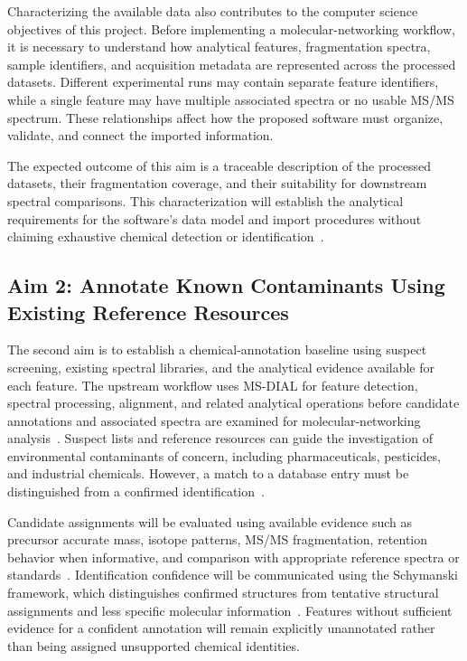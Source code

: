         Characterizing the available data also contributes to the computer science objectives of this project. Before implementing a molecular-networking workflow, it is necessary to understand how analytical features, fragmentation spectra, sample identifiers, and acquisition metadata are represented across the processed datasets. Different experimental runs may contain separate feature identifiers, while a single feature may have multiple associated spectra or no usable MS/MS spectrum. These relationships affect how the proposed software must organize, validate, and connect the imported information.

        The expected outcome of this aim is a traceable description of the processed datasets, their fragmentation coverage, and their suitability for downstream spectral comparisons. This characterization will establish the analytical requirements for the software's data model and import procedures without claiming exhaustive chemical detection or identification~\cite{Fisher2022,Schulze2020}.

    \subsection{Aim 2: Annotate Known Contaminants Using Existing Reference Resources}\label{subsec:aim-two}

        The second aim is to establish a chemical-annotation baseline using suspect screening, existing spectral libraries, and the analytical evidence available for each feature. The upstream workflow uses MS-DIAL for feature detection, spectral processing, alignment, and related analytical operations before candidate annotations and associated spectra are examined for molecular-networking analysis~\cite{Tsugawa2015,Tsugawa2020}. Suspect lists and reference resources can guide the investigation of environmental contaminants of concern, including pharmaceuticals, pesticides, and industrial chemicals. However, a match to a database entry must be distinguished from a confirmed identification~\cite{Manz2023,Gray2022,NinoSuastegui2025}.

        Candidate assignments will be evaluated using available evidence such as precursor accurate mass, isotope patterns, MS/MS fragmentation, retention behavior when informative, and comparison with appropriate reference spectra or standards~\cite{Kind2018,Hupatz2025}. Identification confidence will be communicated using the Schymanski framework, which distinguishes confirmed structures from tentative structural assignments and less specific molecular information~\cite{Schymanski2014}. Features without sufficient evidence for a confident annotation will remain explicitly unannotated rather than being assigned unsupported chemical identities.

